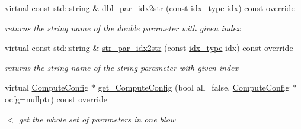 \begin{Indent}
\begin{DoxyCompactItemize}
virtual const std\+::string \& \mbox{\hyperlink{class_s_m_spp__di__unipi__it_1_1_f_row_constraint_a93f1297e7910e91cc18b303376191026}{dbl\+\_\+par\+\_\+idx2str}} (const \mbox{\hyperlink{class_s_m_spp__di__unipi__it_1_1_thin_compute_interface_aa3d710629ad8c434286726ad810c3b47}{idx\+\_\+type}} idx) const override
\begin{DoxyCompactList}\small\item\em returns the string name of the double parameter with given index \end{DoxyCompactList}\item 
virtual const std\+::string \& \mbox{\hyperlink{class_s_m_spp__di__unipi__it_1_1_f_row_constraint_a216c7c4b025d1bc2e3b1a89dc2c1d46f}{str\+\_\+par\+\_\+idx2str}} (const \mbox{\hyperlink{class_s_m_spp__di__unipi__it_1_1_thin_compute_interface_aa3d710629ad8c434286726ad810c3b47}{idx\+\_\+type}} idx) const override
\begin{DoxyCompactList}\small\item\em returns the string name of the string parameter with given index \end{DoxyCompactList}\item 
virtual \mbox{\hyperlink{class_s_m_spp__di__unipi__it_1_1_compute_config}{Compute\+Config}} $\ast$ \mbox{\hyperlink{class_s_m_spp__di__unipi__it_1_1_f_row_constraint_af420d3dff49afbccc8a0c2de86374eeb}{get\+\_\+\+Compute\+Config}} (bool all=false, \mbox{\hyperlink{class_s_m_spp__di__unipi__it_1_1_compute_config}{Compute\+Config}} $\ast$ocfg=nullptr) const override
\begin{DoxyCompactList}\small\item\em $<$ get the whole set of parameters in one blow \end{DoxyCompactList}\end{DoxyCompactItemize}
\end{Indent}
